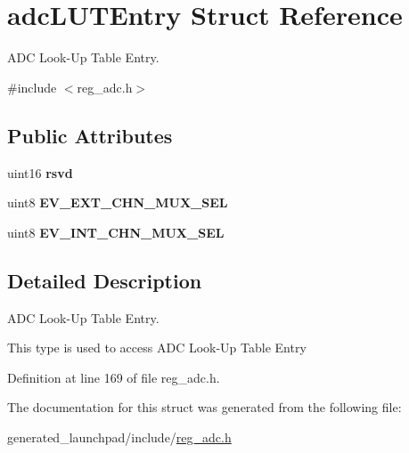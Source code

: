 \hypertarget{structadcLUTEntry}{}\section{adc\+L\+U\+T\+Entry Struct Reference}
\label{structadcLUTEntry}


A\+DC Look-\/\+Up Table Entry.  




{\ttfamily \#include $<$reg\+\_\+adc.\+h$>$}

\subsection*{Public Attributes}
\begin{DoxyCompactItemize}
\item 
\mbox{\label{structadcLUTEntry_a09f1d5ea427799d22f98053cb4192080}} 
uint16 {\bfseries rsvd}
\item 
\mbox{\label{structadcLUTEntry_a68e5bbe48cb51d3f538327d1b0a4d8d1}} 
uint8 {\bfseries E\+V\+\_\+\+E\+X\+T\+\_\+\+C\+H\+N\+\_\+\+M\+U\+X\+\_\+\+S\+EL}
\item 
\mbox{\label{structadcLUTEntry_a7bcb4068b0759d431364bae1606ff054}} 
uint8 {\bfseries E\+V\+\_\+\+I\+N\+T\+\_\+\+C\+H\+N\+\_\+\+M\+U\+X\+\_\+\+S\+EL}
\end{DoxyCompactItemize}


\subsection{Detailed Description}
A\+DC Look-\/\+Up Table Entry. 

This type is used to access A\+DC Look-\/\+Up Table Entry 

Definition at line 169 of file reg\+\_\+adc.\+h.



The documentation for this struct was generated from the following file\+:\begin{DoxyCompactItemize}
\item 
generated\+\_\+launchpad/include/\mbox{\hyperlink{reg__adc_8h}{reg\+\_\+adc.\+h}}\end{DoxyCompactItemize}
